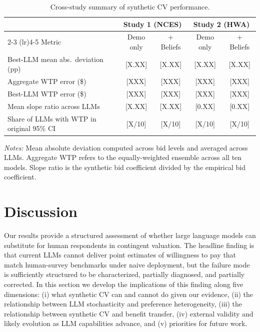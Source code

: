 \documentclass[12pt]{article}
\begin{document}
\begin{table}[h]
    \centering
    \caption{Cross-study summary of synthetic CV performance.}
    \label{tab:cross-study}
    \begin{threeparttable}
    \begin{tabular}{lcccc}
        \toprule
         & \multicolumn{2}{c}{Study 1 (NCES)} & \multicolumn{2}{c}{Study 2 (HWA)} \\
        \cmidrule(lr){2-3} \cmidrule(lr){4-5}
        Metric & Demo only & + Beliefs & Demo only & + Beliefs \\
        \midrule
        Best-LLM mean abs.\ deviation (pp)        & [X.XX] & [X.XX] & [X.XX] & [X.XX] \\
        Aggregate WTP error (\$)                  & [XXX]  & [XXX]  & [XXX]  & [XXX]  \\
        Best-LLM WTP error (\$)                   & [XXX]  & [XXX]  & [XXX]  & [XXX]  \\
        Mean slope ratio across LLMs              & [X.XX] & [X.XX] & [0.XX] & [0.XX] \\
        Share of LLMs with WTP in original 95\% CI & [X/10] & [X/10] & [X/10] & [X/10] \\
        \bottomrule
    \end{tabular}
    \begin{tablenotes}\footnotesize
    \item \textit{Notes:} Mean absolute deviation computed across bid levels and averaged across LLMs. Aggregate WTP refers to the equally-weighted ensemble across all ten models. Slope ratio is the synthetic bid coefficient divided by the empirical bid coefficient.
    \end{tablenotes}
    \end{threeparttable}
\end{table}



\section{Discussion}\label{sec:discussion}

Our results provide a structured assessment of whether large language models can substitute for human respondents in contingent valuation. The headline finding is that current LLMs cannot deliver point estimates of willingness to pay that match human-survey benchmarks under naive deployment, but the failure mode is sufficiently structured to be characterized, partially diagnosed, and partially corrected. In this section we develop the implications of this finding along five dimensions: (i) what synthetic CV can and cannot do given our evidence, (ii) the relationship between LLM stochasticity and preference heterogeneity, (iii) the relationship between synthetic CV and benefit transfer, (iv) external validity and likely evolution as LLM capabilities advance, and (v) priorities for future work.
\end{document}

